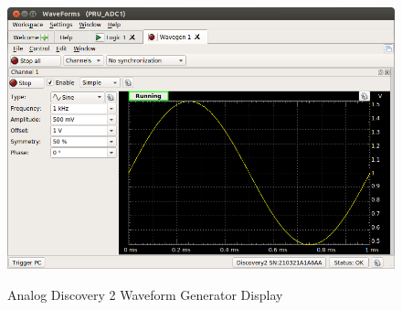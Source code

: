 		\begin{figure}[H]
			\centering
			\includegraphics[width=\textwidth]{photos/discovery2_waveform}
			\centering\bfseries
			\caption{Analog Discovery 2 Waveform Generator Display}
		\end{figure}
		
		



	
	
